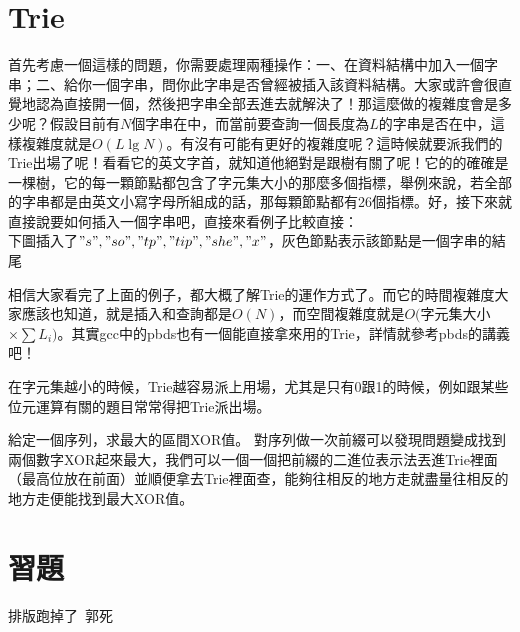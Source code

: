 \section{Trie}
首先考慮一個這樣的問題，你需要處理兩種操作：一、在資料結構中加入一個字串；二、給你一個字串，問你此字串是否曾經被插入該資料結構。大家或許會很直覺地認為直接開一個，然後把字串全部丟進去就解決了！那這麼做的複雜度會是多少呢？假設目前有$N$個字串在中，而當前要查詢一個長度為$L$的字串是否在中，這樣複雜度就是$O(L\lg N)$。有沒有可能有更好的複雜度呢？這時候就要派我們的Trie出場了呢！看看它的英文字首，就知道他絕對是跟樹有關了呢！它的的確確是一棵樹，它的每一顆節點都包含了字元集大小的那麼多個指標，舉例來說，若全部的字串都是由英文小寫字母所組成的話，那每顆節點都有26個指標。好，接下來就直接說要如何插入一個字串吧，直接來看例子比較直接：\\
下圖插入了$"s", "so", "tp", "tip", "she", "x"$，灰色節點表示該節點是一個字串的結尾
\begin{center}

\iftrue
{}
\fi
\end{center}
相信大家看完了上面的例子，都大概了解Trie的運作方式了。而它的時間複雜度大家應該也知道，就是插入和查詢都是$O(N)$，而空間複雜度就是$O($字元集大小$\times \sum L_i)$。其實gcc中的pbds也有一個能直接拿來用的Trie，詳情就參考pbds的講義吧！

在字元集越小的時候，Trie越容易派上用場，尤其是只有0跟1的時候，例如跟某些位元運算有關的題目常常得把Trie派出場。

 {
給定一個序列，求最大的區間XOR值。
}
對序列做一次前綴可以發現問題變成找到兩個數字XOR起來最大，我們可以一個一個把前綴的二進位表示法丟進Trie裡面（最高位放在前面）並順便拿去Trie裡面查，能夠往相反的地方走就盡量往相反的地方走便能找到最大XOR值。
\section{習題}
排版跑掉了\ 郭死\\

